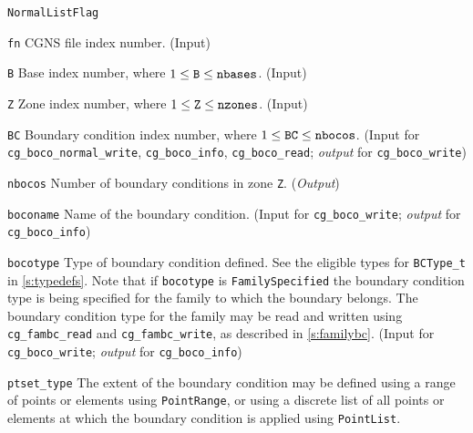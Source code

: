 \begin{Ventryi}{\texttt{NormalListFlag}}\raggedright
\item [\texttt{fn}]
      CGNS file index number.
      (\textcolor{input}{Input})
\item [\texttt{B}]
      Base index number, where $1 \leq \text{\texttt{B}} \leq \text{\texttt{nbases}}$.
      (\textcolor{input}{Input})
\item [\texttt{Z}]
      Zone index number, where $1 \leq \text{\texttt{Z}} \leq \text{\texttt{nzones}}$.
      (\textcolor{input}{Input})
\item [\texttt{BC}]
      Boundary condition index number, where $1 \leq \text{\texttt{BC}} \leq \text{\texttt{nbocos}}$.
      (\textcolor{input}{Input} for \texttt{cg\_boco\_normal\_write},
      \texttt{cg\_boco\_info}, \texttt{cg\_boco\_read};
      \textcolor{output}{\textit{output}} for \texttt{cg\_boco\_write})
\item [\texttt{nbocos}]
      Number of boundary conditions in zone \texttt{Z}.
      (\textcolor{output}{\textit{Output}})
\item [\texttt{boconame}]
      Name of the boundary condition.
      (\textcolor{input}{Input} for \texttt{cg\_boco\_write};
      \textcolor{output}{\textit{output}} for \texttt{cg\_boco\_info})
\item [\texttt{bocotype}]
      Type of boundary condition defined.
      See the eligible types for \texttt{BCType\_t} in \autoref{s:typedefs}.
      Note that if \texttt{bocotype} is \texttt{FamilySpecified}
      the boundary condition type is being specified for the family
      to which the boundary belongs.
      The boundary condition type for the family may be read and written
      using \texttt{cg\_fambc\_read} and \texttt{cg\_fambc\_write},
      as described in \autoref{s:familybc}.
      (\textcolor{input}{Input} for \texttt{cg\_boco\_write};
      \textcolor{output}{\textit{output}} for \texttt{cg\_boco\_info})
\item [\texttt{ptset\_type}]
      The extent of the boundary condition may be defined using a range
      of points or elements using \texttt{PointRange}, or using a
      discrete list of all points or elements at which the boundary
      condition is applied using \texttt{PointList}.


\end{Ventryi}
